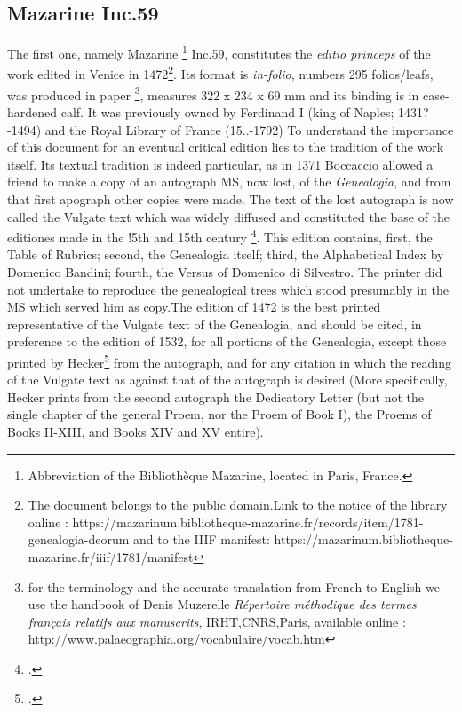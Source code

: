 \documentclass[12pt]{article}
\begin{document}
\subsection{Mazarine Inc.59}

The first one, namely Mazarine \footnote{Abbreviation of the Bibliothèque Mazarine, located in Paris, France.} Inc.59, constitutes the \textit{editio princeps} of the work edited in Venice in 1472\footnote{The document belongs to the public domain.Link to the notice of the library online : https://mazarinum.bibliotheque-mazarine.fr/records/item/1781-genealogia-deorum and to the IIIF manifest:  https://mazarinum.bibliotheque-mazarine.fr/iiif/1781/manifest}. Its format is \textit{in-folio}, numbers 295 folios/leafs, was produced in paper \footnote{for the terminology and the accurate translation from French to English we use the handbook of Denis Muzerelle \textit{Répertoire méthodique
des termes français
relatifs aux manuscrits}, IRHT,CNRS,Paris, available online : http://www.palaeographia.org/vocabulaire/vocab.htm }, measures 322 x 234 x 69 mm and its binding is in case-hardened calf. It was previously owned by Ferdinand I (king of Naples; 1431?-1494) and the
Royal Library of France (15..-1792)
To understand the importance of this document for an eventual critical edition lies to the tradition of the work itself. Its textual tradition is indeed particular, as in 1371 Boccaccio allowed a friend to make a copy of an autograph MS, now lost, of the \textit{Genealogia}, and from that first apograph other copies were made. The text of the lost autograph is now called the Vulgate text which was widely diffused and constituted the base of the editiones made in the !5th and 15th century \footcite{ernest1919}.  This edition contains, first, the Table of Rubrics; second, the Genealogia itself; third, the Alphabetical Index by Domenico Bandini; fourth, the Versus of Domenico di Silvestro. The printer did not undertake to reproduce the genealogical trees which stood presumably in the MS which served him as copy.The edition of 1472 is  the best printed representative of the Vulgate text of the Genealogia, and should be cited, in preference to the edition of 1532, for all portions of the Genealogia, except those printed by Hecker\footcite{hecker1902} from the autograph, and for any citation in which the reading of the Vulgate text as against that of the autograph is desired (More specifically, Hecker prints from the second autograph the Dedicatory Letter (but not the single chapter of the general Proem, nor the Proem of Book I), the Proems of Books II-XIII, and Books XIV and XV entire).
\\ 
\end{document}
